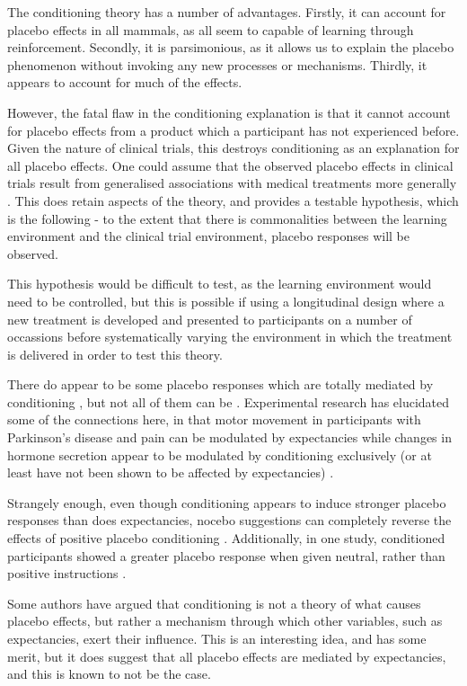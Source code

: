 The conditioning theory has a number of advantages. Firstly, it can account for placebo effects in all mammals, as all seem to capable of learning through reinforcement. Secondly, it is parsimonious, as it allows us to explain the placebo phenomenon without invoking any new processes or mechanisms. Thirdly, it appears to account for much of the effects. 

However, the fatal flaw in the conditioning explanation is that it cannot account for placebo effects from a product which a participant  has not experienced before. Given the nature of clinical trials, this destroys  conditioning as an explanation for all placebo effects.  One could assume that the observed placebo effects in clinical trials result from generalised associations with medical treatments more generally \cite{pearce1987model}. This does retain aspects of the theory, and provides a testable hypothesis, which is the following - to the extent that there is commonalities between the learning environment and the clinical trial environment, placebo responses will be observed.  

This hypothesis would be difficult to test, as the learning environment would need to be controlled, but this is possible if using a longitudinal design where a new treatment is developed and presented to participants on a number of occassions before systematically varying the environment in which the treatment is delivered in order to test this theory. 

There do appear to be some placebo responses which are totally mediated by conditioning \cite{Amanzio1999}, but not all of them can be \cite{Benedetti2003a}. Experimental research has elucidated some of the connections here, in that motor movement in participants with Parkinson's disease and pain can be modulated by expectancies while changes in hormone secretion appear to be modulated by conditioning exclusively (or at least have not been shown to be affected by expectancies) \cite{Benedetti2003a}.

Strangely enough, even though conditioning appears to induce stronger placebo responses than does expectancies, nocebo suggestions can completely reverse the effects of positive placebo conditioning \cite{Benedetti2008}. Additionally, in one study, conditioned participants showed a greater placebo response when given neutral, rather than positive instructions \cite{Klinger2007a}. 

Some authors have argued \cite{Stewart-Williams2004b} that conditioning is not a theory of what causes placebo effects, but rather a mechanism through which other variables, such as expectancies, exert their influence. This is an interesting idea, and has some merit, but it does suggest that all placebo effects are mediated by expectancies, and this is known to not be the case. 

